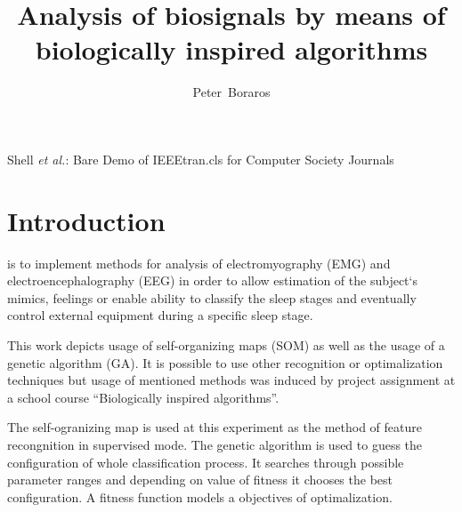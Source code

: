 \documentclass[a4paper,jurnal]{IEEEtran}
\begin{document}
\title{Analysis of biosignals by means of\\ biologically inspired algorithms}

\author{Peter~Boraros%
}



%
{Shell \MakeLowercase{\textit{et al.}}: Bare Demo of IEEEtran.cls for Computer Society Journals}


\maketitle
\IEEEdisplaynotcompsoctitleabstractindextext
\IEEEpeerreviewmaketitle


\section{Introduction}
 is to implement methods for analysis of
electromyography (EMG) and electroencephalography (EEG)
in order to allow estimation of the subject`s mimics, 
feelings or enable ability to classify the sleep stages and eventually control 
external equipment during a specific sleep stage.

This work depicts usage of self-organizing maps (SOM) as well as the usage of a genetic
algorithm (GA). It is possible to use other recognition or optimalization
techniques but usage of mentioned 
methods was induced by project assignment at a school course ``Biologically inspired 
algorithms''.

The self-ogranizing map is used  at this experiment as the method of feature recongnition in 
supervised mode. The genetic algorithm is used to guess the configuration of 
whole classification process. It searches through possible parameter ranges and 
depending on value of fitness it chooses the best configuration. A fitness function
models a objectives of optimalization.
\end{document}
